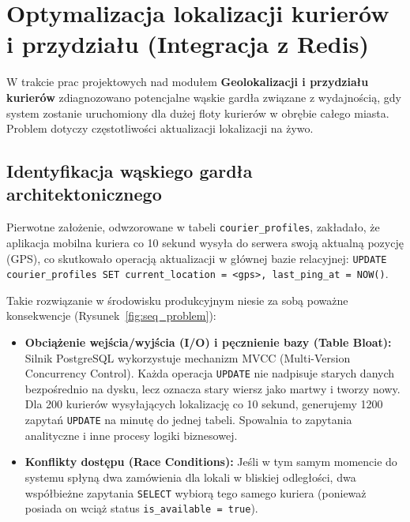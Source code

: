 \documentclass[11pt,a4paper]{article}
\begin{document}


\newpage
\section{Optymalizacja lokalizacji kurierów i przydziału (Integracja z Redis)}

W trakcie prac projektowych nad modułem \textbf{Geolokalizacji i przydziału kurierów} zdiagnozowano potencjalne wąskie gardła związane z wydajnością, gdy system zostanie uruchomiony dla dużej floty kurierów w obrębie całego miasta. Problem dotyczy częstotliwości aktualizacji lokalizacji na żywo.

\subsection{Identyfikacja wąskiego gardła architektonicznego}

Pierwotne założenie, odwzorowane w tabeli \texttt{courier\_profiles}, zakładało, że aplikacja mobilna kuriera co 10 sekund wysyła do serwera swoją aktualną pozycję (GPS), co skutkowało operacją aktualizacji w głównej bazie relacyjnej: \texttt{UPDATE courier\_profiles SET current\_location = <gps>, last\_ping\_at = NOW()}. 

Takie rozwiązanie w środowisku produkcyjnym niesie za sobą poważne konsekwencje (Rysunek~\ref{fig:seq_problem}):
\begin{itemize}
    \item \textbf{Obciążenie wejścia/wyjścia (I/O) i pęcznienie bazy (Table Bloat):} Silnik PostgreSQL wykorzystuje mechanizm MVCC (Multi-Version Concurrency Control). Każda operacja \texttt{UPDATE} nie nadpisuje starych danych bezpośrednio na dysku, lecz oznacza stary wiersz jako martwy i tworzy nowy. Dla 200 kurierów wysyłających lokalizację co 10 sekund, generujemy 1200 zapytań \texttt{UPDATE} na minutę do jednej tabeli. Spowalnia to zapytania analityczne i inne procesy logiki biznesowej.
    \item \textbf{Konflikty dostępu (Race Conditions):} Jeśli w tym samym momencie do systemu spłyną dwa zamówienia dla lokali w bliskiej odległości, dwa współbieżne zapytania \texttt{SELECT} wybiorą tego samego kuriera (ponieważ posiada on wciąż status \texttt{is\_available = true}).
\end{itemize}
\end{document}
